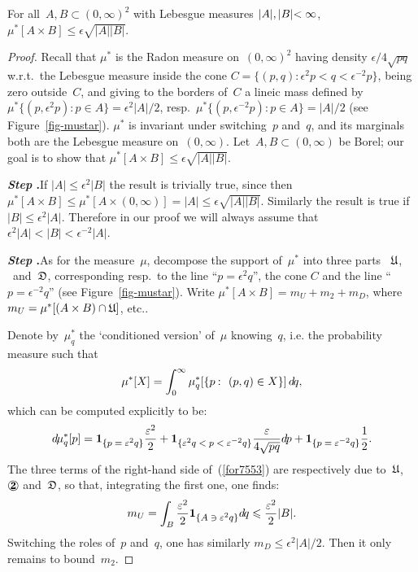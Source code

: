 \begin{Lem}\label{clm8768}
For all~$A,B \subset (0,\infty)^2$ with Lebesgue measures $|A|,|B| \allowbreak {<\infty}$,
${\mu^*[A\times B]} \leq \epsilon \sqrt{|A||B|}$.
\end{Lem}
%
\begingroup{}
\begin{proof}
Recall that $\mu^*$ is the Radon measure on~$(0,\infty)^2$
having density $\epsilon/4\sqrt{pq}$ w.r.t.\ the Lebesgue measure
inside the cone $C = \{(p,q)\colon \epsilon^2p<q<\epsilon^{-2}p\}$,
being zero outside~$C$,
and giving to the borders of~$C$ a lineic mass defined by
$\mu^*\{ (p,\epsilon^2p) \colon p \in A \} = \epsilon^2|A|/2$, resp.\ 
$\mu^*\{ (p,\epsilon^{-2}p) \colon p \in A \} = |A|/2$ (see Figure~\ref{fig-mustar}).
$\mu^*$ is invariant under switching~$p$ and~$q$,
and its marginals both are the Lebesgue measure on~$(0,\infty)$.
Let~$A, B \subset (0,\infty)$ be Borel;
our goal is to show that $\mu^*[A\times B] \leq \epsilon\sqrt{|A||B|}$.

\newcommand{\step}{\addtocounter{step}{1}\textbf{\textit{Step \arabic{step}}.}\quad}
\step If $|A| \leq \epsilon^2|B|$ the result is trivially true,
since then $\mu^*[A\times B] \leq \mu^*[A\times (0,\infty)] = |A| \leq \epsilon\sqrt{|A||B|}$.
Similarly the result is true if $|B| \leq \epsilon^2|A|$.
Therefore in our proof we will always assume that $\epsilon^2|A| < |B| < \epsilon^{-2}|A|$.

\step As for the measure~$\mu$,
decompose the support of~$\mu^*$ into three parts~%
$\mathfrak{U}$, \twocirc\ and~$\mathfrak{D}$, corresponding resp.\
to the line ``$p=\epsilon^2q$'', the cone $C$ and the line ``$p=\epsilon^{-2}q$''
(see Figure~\ref{fig-mustar}).
Write $\mu^*[A\times B] = m_U + m_2 + m_D$,
where $m_U = \mu^*[(A\times B)\cap\mathfrak{U}]$, etc..

Denote by~$\mu^*_q$ the `conditioned version' of~$\mu$ knowing~$q$, i.e. the probability measure such that
\[ \mu^*[X] = \int_0^{\infty} \mu^*_q [\{p\colon (p,q)\in X\}] \,\dx{q} ,\]
which can be computed explicitly to be:
\[\label{for7553} \dx\mu^*_q[p] = \1{\{p=\epsilon^2q\}} \frac{\epsilon^2}{2}
+ \1{\{\epsilon^2q<p<\epsilon^{-2}q\}} \frac{\epsilon}{4\sqrt{pq}} \dx{p} + \1{\{p=\epsilon^{-2}q\}} \frac{1}{2} .\]
%
The three terms of the right-hand side of~(\ref{for7553}) are respectively due
to~$\mathfrak{U}$, $\twocirc$ and~$\mathfrak{D}$, so that, integrating the first one, one finds:
\[ m_U = \int_B \frac{\epsilon^2}{2} \1{\{A\ni\epsilon^2q\}} \dx{q}
\leq \frac{\epsilon^2}{2} |B| .\]
Switching the roles of~$p$ and~$q$,
one has similarly $m_D \leq \epsilon^2|A|/2$.
Then it only remains to bound~$m_2$.


\end{proof}
